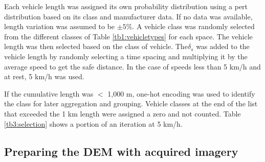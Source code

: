 Each vehicle length was assigned its own probability distribution using a pert distribution based on its class and manufacturer data.  If no data was available, length variation was assumed to be $\pm5\%$. A vehicle class was randomly selected from the different classes of Table \ref{tb1:vehicletypes} for each space.  The vehicle length was then selected based on the class of vehicle.  The$\delta_{s}$ was added to the vehicle length by randomly selecting a time spacing and multiplying it by the average speed to get the safe distance. In the case of speeds less than 5 km/h and at rest, 5 km/h was used.  

If the cumulative length was $<$ 1,000 m, one-hot encoding was used to identify the class for later aggregation and grouping.  Vehicle classes at the end of the list that exceeded the 1 km length were assigned a zero and not counted.  Table \ref{tb3:selection} shows a portion of an iteration at 5 km/h. 

\begin{table}[H]
\centering
\caption[Vehicle density sample]{Sample of an iteration showing vehicle class and road space selection for speed = 5 km/h.}
\label{tb3:selection}
\end{table}

\subsection{Preparing the DEM with acquired imagery}

